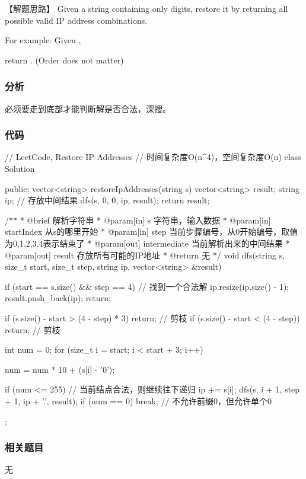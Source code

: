 【解题思路】
Given a string containing only digits, restore it by returning all possible valid IP address combinations.

For example:
Given ,

return \code{["255.255.11.135", "255.255.111.35"]}. (Order does not matter)


\subsubsection{分析}
必须要走到底部才能判断解是否合法，深搜。


\subsubsection{代码}
\begin{Code}
	// LeetCode, Restore IP Addresses
	// 时间复杂度O(n^4)，空间复杂度O(n)
	class Solution {
		public:
		vector<string> restoreIpAddresses(string s) {
			vector<string> result;
			string ip; // 存放中间结果
			dfs(s, 0, 0, ip, result);
			return result;
		}
		
		/**
		* @brief 解析字符串
		* @param[in] s 字符串，输入数据
		* @param[in] startIndex 从s的哪里开始
		* @param[in] step 当前步骤编号，从0开始编号，取值为0,1,2,3,4表示结束了
		* @param[out] intermediate 当前解析出来的中间结果
		* @param[out] result 存放所有可能的IP地址
		* @return 无
		*/
		void dfs(string s, size_t start, size_t step, string ip,
		vector<string> &result) {
			if (start == s.size() && step == 4) {  // 找到一个合法解
				ip.resize(ip.size() - 1);
				result.push_back(ip);
				return;
			}
			
			if (s.size() - start > (4 - step) * 3)
			return;  // 剪枝
			if (s.size() - start < (4 - step))
			return;  // 剪枝
			
			int num = 0;
			for (size_t i = start; i < start + 3; i++) {
				num = num * 10 + (s[i] - '0');
				
				if (num <= 255) {  // 当前结点合法，则继续往下递归
					ip += s[i];
					dfs(s, i + 1, step + 1, ip + '.', result);
				}
				if (num == 0) break;  // 不允许前缀0，但允许单个0
			}
		}
	};
\end{Code}


\subsubsection{相关题目}
\begindot
\item 无
\myenddot


